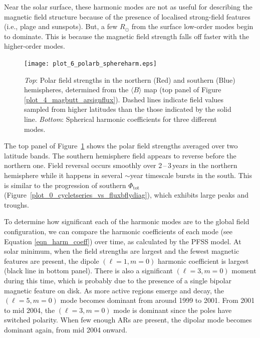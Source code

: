 Near the solar surface, these harmonic modes are not as useful for describing the magnetic field structure because of the presence of localised strong-field features (i.e., plage and sunspots). But, a few $R_\odot$ from the surface low-order modes begin to dominate. This is because the magnetic field strength falls off faster with the higher-order modes.


\begin{figure}[!t]
\centerline{\texttt{[image: plot\_6\_polarb\_sphereharm.eps]}}
\caption[Global magnetic field spherical harmonic strengths over time.]{\emph{Top}: Polar field strengths in the northern (Red) and southern (Blue) hemispheres, determined from the $\langle B \rangle$ map (top panel of Figure\,\ref{plot_4_magbutt_arsignflux}). Dashed lines indicate field values sampled from higher latitudes than the those indicated by the solid line.  \emph{Bottom}: Spherical harmonic coefficients for three different modes.}
\label{plot_6_polarb_sphereharm}
\end{figure}

The top panel of Figure~\ref{plot_6_polarb_sphereharm} shows the polar field strengths averaged over two latitude bands. The southern hemisphere field appears to reverse before the northern one. Field reversal occurs smoothly over 2\,--\,3\,years in the northern hemisphere while it happens in several $\sim$year timescale bursts in the south. This is similar to the progression of southern $\Phi_{\mathrm{tot}}$ (Figure~\ref{plot_0_cycletseries_vs_fluxbflydiag}), which exhibits large peaks and troughs.

To determine how significant each of the harmonic modes are to the global field configuration, we can compare the harmonic coefficients of each mode (see Equation \ref{eqn_harm_coeff}) over time, as calculated by the \gls{PFSS} model. At solar minimum, when the field strengths are largest and the fewest magnetic features are present, the dipole $(\ell=1,m=0)$ harmonic coefficient is largest (black line in bottom panel). There is also a significant $(\ell=3,m=0)$ moment during this time, which is probably due to the presence of a single bipolar magnetic feature on disk. As more active regions emerge and decay, the $(\ell=5,m=0)$ mode becomes dominant from around 1999 to 2001. From 2001 to mid 2004, the $(\ell=3,m=0)$ mode is dominant since the poles have switched polarity. When few enough \glspl{AR} are present, the dipolar mode becomes dominant again, from mid 2004 onward.


